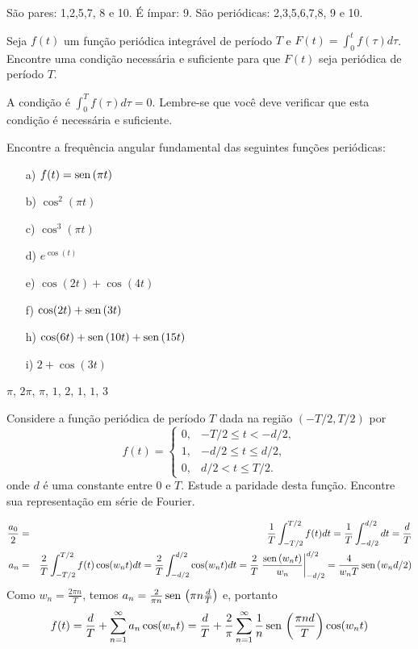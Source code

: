 \begin{Answer}
São pares: 1,2,5,7, 8 e 10. É ímpar: 9. São periódicas: 2,3,5,6,7,8, 9 e 10. 
\end{Answer}
\begin{Exercise}Seja $f(t)$ um função periódica integrável de período $T$ e $F(t)=\int_0^tf(\tau)d\tau$. Encontre uma condição necessária e suficiente para que $F(t)$ seja periódica de período $T$.
\end{Exercise}
\begin{Answer}
 A condição é $\int_0^Tf(\tau)d\tau=0$. Lembre-se que você deve verificar que esta condição é necessária e suficiente.
\end{Answer}
 \begin{Exercise}{\label{freq_fund}} Encontre a frequência angular fundamental das seguintes funções periódicas:
\begin{itemize}
\item [a)] $f(t)= \operatorname{sen}\,(\pi t)$
\item [b)] $\cos^2(\pi t)$
\item [c)] $\cos^3(\pi t)$
\item [d)] $e^{\cos(t)}$
\item [e)] $\cos(2t)+\cos(4t)$
\item [f)] $\cos(2t)+\operatorname{sen}\,(3t)$
\item [h)] $\cos(6t)+\operatorname{sen}\,(10t)+\operatorname{sen}\,(15t)$
\item [i)] $2+\cos(3t)$
\end{itemize}
\end{Exercise}
\begin{Answer}
$\pi$, $2\pi$, $\pi$, $1$, $2$, $1$, $1$, $3$
\end{Answer}
 \begin{Exercise}
Considere a função periódica de período $T$ dada na região $(-T/2,T/2)$ por
$$f(t)=\left\{
\begin{array}{lc}
0,&-T/2\leq t < -d/2,\\
1,&-d/2\leq t \leq d/2,\\
0,&d/2 < t \leq T/2.
\end{array}
\right.$$
onde $d$ é uma constante entre $0$ e $T$.
Estude a paridade desta função. Encontre sua representação em série de Fourier. 
\end{Exercise}
\begin{Answer}
\begin{eqnarray*} \frac{a_0}{2}&=&\frac{1}{T}\int_{-T/2}^{T/2}f(t)dt=\frac{1}{T}\int_{-d/2}^{d/2}dt=\frac{d}{T}\\
a_n&=&\frac{2}{T}\int_{-T/2}^{T/2}f(t)\cos(w_nt)dt=\frac{2}{T}\int_{-d/2}^{d/2}\cos(w_nt)dt=\frac{2}{T}\left.\frac{\operatorname{sen}\,(w_nt)}{w_n}\right|_{-d/2}^{d/2}=\frac{4}{w_nT}\operatorname{sen}\,(w_nd/2)
\end{eqnarray*}
Como
$w_n=\frac{2\pi n}{T}$, temos $ a_n=\frac{2}{\pi n}\operatorname{sen}\,\left(\pi n\frac{d}{T}\right)$ e, portanto
\begin{equation}f(t)=\frac{d}{T}+\sum_{n=1}^\infty a_n \cos(w_n t)=\frac{d}{T}+\frac{2}{\pi}\sum_{n=1}^\infty \frac{1}{n}\operatorname{sen}\,\left(\frac{\pi n d}{T}\right) \cos(w_n t)\end{equation}
\end{Answer}
